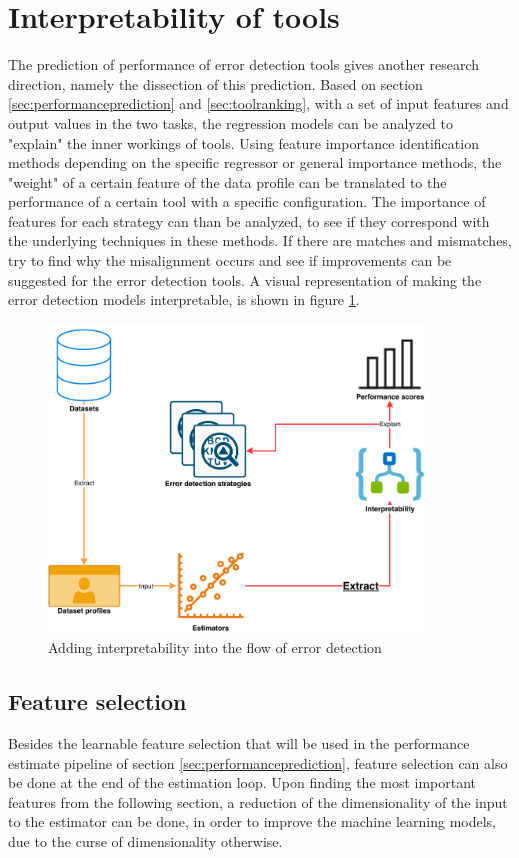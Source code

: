 \section{Interpretability of tools}
\label{sec:interpretabilityoftools}
The prediction of performance of error detection tools gives another research direction, namely the dissection of this prediction.
Based on section \ref{sec:performanceprediction} and \ref{sec:toolranking}, with a set of input features and output values in the two tasks, the regression models can be analyzed to "explain" the inner workings of tools. Using feature importance identification methods depending on the specific regressor or general importance methods, the "weight" of a certain feature of the data profile can be translated to the performance of a certain tool with a specific configuration. The importance of features for each strategy can than be analyzed, to see if they correspond with the underlying techniques in these methods. If there are matches and mismatches, try to find why the misalignment occurs and see if improvements can be suggested for the error detection tools. A visual representation of making the error detection models interpretable, is shown in figure \ref{fig:method_interpret}.

\begin{figure}
    \centering
    \includegraphics[width=0.9\textwidth]{thesis/Figures/Method/PerformanceEstimation-Interpretability.pdf}
    \caption{Adding interpretability into the flow of error detection}
    \label{fig:method_interpret}
\end{figure}

\subsection{Feature selection}
\label{subsec:featureselection}
Besides the learnable feature selection that will be used in the performance estimate pipeline of section \ref{sec:performanceprediction}, feature selection can also be done at the end of the estimation loop. Upon finding the most important features from the following section, a reduction of the dimensionality of the input to the estimator can be done, in order to improve the machine learning models, due to the curse of dimensionality otherwise. 


